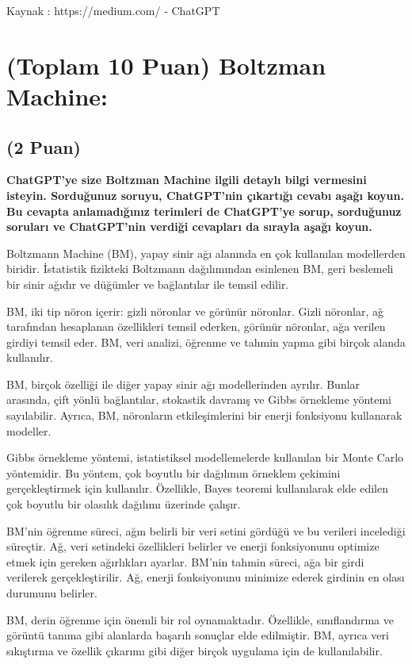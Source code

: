 \documentclass[11pt]{article}
\begin{document}
Kaynak : https://medium.com/   - ChatGPT

\section{(Toplam 10 Puan) Boltzman Machine:}

\subsection{(2 Puan)} \textbf{ChatGPT’ye size Boltzman Machine ilgili detaylı bilgi vermesini isteyin. Sorduğunuz soruyu, ChatGPT'nin çıkartığı cevabı aşağı koyun. Bu cevapta anlamadığınız terimleri de ChatGPT’ye sorup, sorduğunuz soruları ve ChatGPT’nin verdiği cevapları da sırayla aşağı koyun.}

Boltzmann Machine (BM), yapay sinir ağı alanında en çok kullanılan modellerden biridir. İstatistik fizikteki Boltzmann dağılımından esinlenen BM, geri beslemeli bir sinir ağıdır ve düğümler ve bağlantılar ile temsil edilir.

BM, iki tip nöron içerir: gizli nöronlar ve görünür nöronlar. Gizli nöronlar, ağ tarafından hesaplanan özellikleri temsil ederken, görünür nöronlar, ağa verilen girdiyi temsil eder. BM, veri analizi, öğrenme ve tahmin yapma gibi birçok alanda kullanılır.

BM, birçok özelliği ile diğer yapay sinir ağı modellerinden ayrılır. Bunlar arasında, çift yönlü bağlantılar, stokastik davranış ve Gibbs örnekleme yöntemi sayılabilir. Ayrıca, BM, nöronların etkileşimlerini bir enerji fonksiyonu kullanarak modeller.

Gibbs örnekleme yöntemi, istatistiksel modellemelerde kullanılan bir Monte Carlo yöntemidir. Bu yöntem, çok boyutlu bir dağılımın örneklem çekimini gerçekleştirmek için kullanılır. Özellikle, Bayes teoremi kullanılarak elde edilen çok boyutlu bir olasılık dağılımı üzerinde çalışır.

BM'nin öğrenme süreci, ağın belirli bir veri setini gördüğü ve bu verileri incelediği süreçtir. Ağ, veri setindeki özellikleri belirler ve enerji fonksiyonunu optimize etmek için gereken ağırlıkları ayarlar. BM'nin tahmin süreci, ağa bir girdi verilerek gerçekleştirilir. Ağ, enerji fonksiyonunu minimize ederek girdinin en olası durumunu belirler.

BM, derin öğrenme için önemli bir rol oynamaktadır. Özellikle, sınıflandırma ve görüntü tanıma gibi alanlarda başarılı sonuçlar elde edilmiştir. BM, ayrıca veri sıkıştırma ve özellik çıkarımı gibi diğer birçok uygulama için de kullanılabilir.
\end{document}
